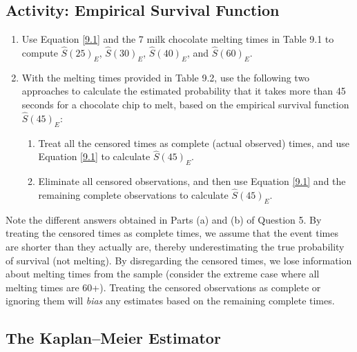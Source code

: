 \documentclass[
]{book}
\providecommand{\tightlist}{%
  \setlength{\itemsep}{0pt}\setlength{\parskip}{0pt}}
\begin{document}
\hypertarget{activity-empirical-survival-function}{%
\subsection*{Activity: Empirical Survival Function}\label{activity-empirical-survival-function}}

\begin{enumerate}
\def\labelenumi{\arabic{enumi}.}
\setcounter{enumi}{3}
\item
  Use Equation \ref{9.1} and the 7 milk chocolate melting times in Table 9.1 to compute \(\hat S(25)_{E}\), \(\hat S(30)_{E}\), \(\hat S(40)_{E}\), and \(\hat S(60)_{E}\).
\item
  With the melting times provided in Table 9.2, use the following two approaches to calculate the estimated probability that it takes more than 45 seconds for a chocolate chip to melt, based on the empirical survival function \(\hat S(45)_{E}\):

  \begin{enumerate}
  \def\labelenumii{\alph{enumii}.}
  \tightlist
  \item
    Treat all the censored times as complete (actual observed) times, and use Equation \ref{9.1} to calculate \(\hat S(45)_{E}\).\\
  \item
    Eliminate all censored observations, and then use Equation \ref{9.1} and the remaining complete observations to calculate \(\hat S(45)_{E}\).
  \end{enumerate}
\end{enumerate}

Note the different answers obtained in Parts (a) and (b) of Question 5. By treating the censored times as complete times, we assume that the event times are shorter than they actually are, thereby underestimating the true probability of survival (not melting). By disregarding the censored times, we lose information about melting times from the sample (consider the extreme case where all melting times are 60+). Treating the censored observations as complete or ignoring them will \emph{bias} any estimates based on the remaining complete times.

\hypertarget{the-kaplanmeier-estimator}{%
\subsection*{The Kaplan--Meier Estimator}\label{the-kaplanmeier-estimator}}
\end{document}
